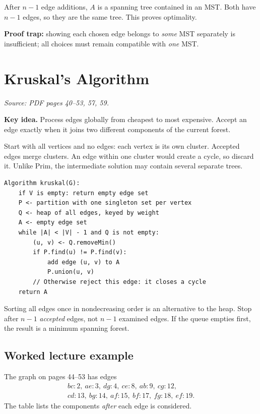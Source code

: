 \documentclass[11pt,letterpaper]{article}
\newcommand{\sourcepages}[1]{\textit{Source: PDF pages #1.}}
\newcommand{\keyidea}[1]{\par\textbf{Key idea.} #1\par}
\begin{document}
After $n-1$ edge additions, $A$ is a spanning tree contained in an MST. Both have $n-1$ edges, so they are the same tree. This proves optimality.

\textbf{Proof trap:} showing each chosen edge belongs to \emph{some} MST separately is insufficient; all choices must remain compatible with \emph{one} MST.

\newpage
\section{Kruskal's Algorithm}
\sourcepages{40--53, 57, 59}

\keyidea{Process edges globally from cheapest to most expensive. Accept an edge exactly when it joins two different components of the current forest.}

Start with all vertices and no edges: each vertex is its own cluster. Accepted edges merge clusters. An edge within one cluster would create a cycle, so discard it. Unlike Prim, the intermediate solution may contain several separate trees.

\begin{lstlisting}[caption={Kruskal using a partition and an edge min-heap}]
Algorithm kruskal(G):
    if V is empty: return empty edge set
    P <- partition with one singleton set per vertex
    Q <- heap of all edges, keyed by weight
    A <- empty edge set
    while |A| < |V| - 1 and Q is not empty:
        (u, v) <- Q.removeMin()
        if P.find(u) != P.find(v):
            add edge (u, v) to A
            P.union(u, v)
        // Otherwise reject this edge: it closes a cycle
    return A
\end{lstlisting}

Sorting all edges once in nondecreasing order is an alternative to the heap. Stop after $n-1$ \emph{accepted} edges, not $n-1$ examined edges. If the queue empties first, the result is a minimum spanning forest.

\subsection{Worked lecture example}
The graph on pages 44--53 has edges
\[
\begin{gathered}
bc:2,\ ae:3,\ dg:4,\ ce:8,\ ab:9,\ cg:12,\\
cd:13,\ bg:14,\ af:15,\ bf:17,\ fg:18,\ ef:19.
\end{gathered}
\]
The table lists the components \emph{after} each edge is considered.
\end{document}
